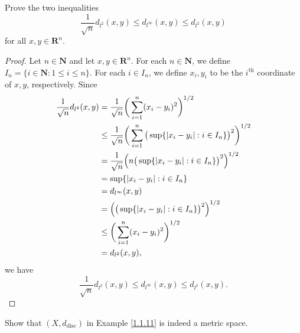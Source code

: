 \begin{exercise}\label{ex 1.1.10}
    Prove the two inequalities
    \[
        \frac{1}{\sqrt{n}} d_{l^2}(x, y) \leq d_{l^\infty}(x, y) \leq d_{l^2}(x, y)
    \]
    for all \(x, y \in \mathbf{R}^n\).
\end{exercise}

\begin{proof}
    Let \(n \in \mathbf{N}\) and let \(x, y \in \mathbf{R}^n\).
    For each \(n \in \mathbf{N}\), we define \(I_n = \{i \in \mathbf{N} : 1 \leq i \leq n\}\).
    For each \(i \in I_n\), we define \(x_i, y_i\) to be the \(i^{\text{th}}\) coordinate of \(x, y\), respectively.
    Since
    \begin{align*}
        \frac{1}{\sqrt{n}} d_{l^2}(x, y) & = \frac{1}{\sqrt{n}} \bigg(\sum_{i = 1}^n (x_i - y_i)^2\bigg)^{1 / 2}                                        \\
                                         & \leq \frac{1}{\sqrt{n}} \bigg(\sum_{i = 1}^n \big(\sup \{\abs*{x_i - y_i} : i \in I_n\}\big)^2\bigg)^{1 / 2} \\
                                         & = \frac{1}{\sqrt{n}} \Big(n \big(\sup \{\abs*{x_i - y_i} : i \in I_n\}\big)^2\Big)^{1 / 2}                   \\
                                         & = \sup \{\abs*{x_i - y_i} : i \in I_n\}                                                                      \\
                                         & = d_{l^\infty}(x, y)                                                                                         \\
                                         & = \Big(\big(\sup \{\abs*{x_i - y_i} : i \in I_n\}\big)^2\Big)^{1 / 2}                                        \\
                                         & \leq \bigg(\sum_{i = 1}^n (x_i - y_i)^2\bigg)^{1 / 2}                                                        \\
                                         & = d_{l^2}(x, y),
    \end{align*}
    we have
    \[
        \frac{1}{\sqrt{n}} d_{l^2}(x, y) \leq d_{l^\infty}(x, y) \leq d_{l^2}(x, y).
    \]
\end{proof}

\begin{exercise}\label{ex 1.1.11}
    Show that \((X, d_{\text{disc}})\) in Example \ref{1.1.11} is indeed a metric space.
\end{exercise}

